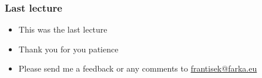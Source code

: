\documentclass[final,handout]{beamer}
\begin{document}
\begin{frame}
    \frametitle{Last lecture}

    \begin{itemize}
        \item This was the last lecture
        
        \item Thank you for you patience

        \item Please send me a feedback or any comments to
            \url{frantisek@farka.eu}

    \end{itemize}

\end{frame}
\end{document}
